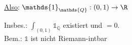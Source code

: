 


\underline{Also}: $\mathds{1}_\mathds{Q}:(0,1)\rightarrow \R$
    
Insbes.: $\int_{(0,1)}\mathds{1}_\mathds{Q}$ existiert und $=0$.
\\
Bem.: $\mathds{1}$ ist nicht Riemann-intbar
